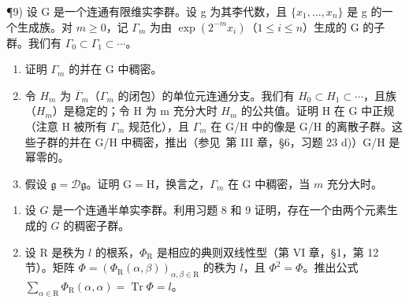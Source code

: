 ¶9) 设 G 是一个连通有限维实李群。设 g 为其李代数，且 \(\{x_{1},\ldots,x_{n}\}\) 是 g 的一个生成族。对 \(m\geq0\)，记 \(\Gamma_{m}\) 为由 \(\exp(2^{-m}x_{i})\)（\(1\leq i\leq n\)）生成的 G 的子群。我们有 \(\Gamma_{0}\subset\Gamma_{1}\subset\cdots\)。

\begin{enumerate}
\def\labelenumi{\alph{enumi})}
\item
  证明 \(\Gamma_{m}\) 的并在 G 中稠密。
\item
  令 \(H_{m}\) 为 \(\overline{\Gamma}_{m}\)（\(\Gamma_{m}\) 的闭包）的单位元连通分支。我们有 \(H_{0} \subset H_{1} \subset \cdots\)，且族（\(H_{m}\)）是稳定的；令 H 为 m 充分大时 \(H_{m}\) 的公共值。证明 H 在 G 中正规（注意 H 被所有 \(\Gamma_{m}\) 规范化），且 \(\Gamma_{m}\) 在 G/H 中的像是 G/H 的离散子群。这些子群的并在 G/H 中稠密，推出（参见~第 III 章，§6，习题 23 d)）G/H 是幂零的。
\item
  假设 \(\mathfrak{g} = \mathcal{D}\mathfrak{g}\)。证明 \(\mathrm{G} = \mathrm{H}\)，换言之，\(\Gamma_{m}\) 在 \(\mathrm{G}\) 中稠密，当 \(m\) 充分大时。
\end{enumerate}

\begin{enumerate}
\def\labelenumi{\arabic{enumi})}
\setcounter{enumi}{9}
\item
  设 \(G\) 是一个连通半单实李群。利用习题 8 和 9 证明，存在一个由两个元素生成的 \(G\) 的稠密子群。
\item
  设 \(\mathrm{R}\) 是秩为 \(l\) 的根系，\(\varPhi_{\mathrm{R}}\) 是相应的典则双线性型（第 VI 章，§1，第 12 节）。矩阵 \(\varPhi = (\varPhi_{\mathrm{R}}(\alpha, \beta))_{\alpha, \beta \in \mathrm{R}}\) 的秩为 \(l\)，且 \(\varPhi^2 = \varPhi\)。推出公式 \(\sum_{\alpha \in \mathrm{R}} \varPhi_{\mathrm{R}}(\alpha, \alpha) = \operatorname{Tr} \varPhi = l\)。
\end{enumerate}

